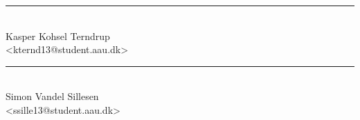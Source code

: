 \noindent
\begin{minipage}[b]{0.45\textwidth}
 \centering
 \rule{\textwidth}{0.5pt}\\
 Kasper Kohsel Terndrup\\
 {\footnotesize <kternd13@student.aau.dk>}
\end{minipage}
\hfill
\begin{minipage}[b]{0.45\textwidth}
 \centering
 \rule{\textwidth}{0.5pt}\\
  Simon Vandel Sillesen\\
 {\footnotesize <ssille13@student.aau.dk>}
\end{minipage}
\vspace{3\baselineskip}
